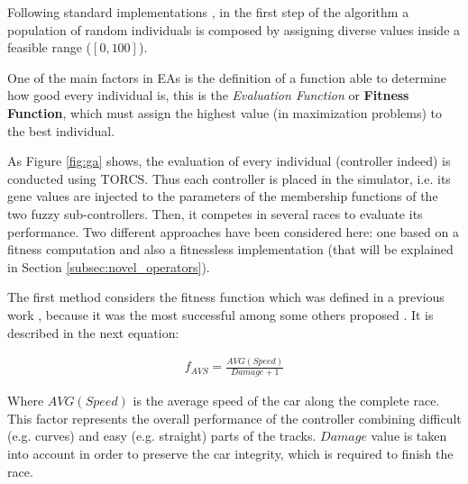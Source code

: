 \documentclass[10pt,journal,compsoc]{IEEEtran}
\begin{document}

Following standard implementations \cite{GAs_Goldberg89}, in the first step of the algorithm \cite{salem_evo17} a population of random individuals is composed by assigning diverse values inside a feasible range ($[0,100]$).

One of the main factors in EAs is the definition of a function able to determine how good every individual is, this is the \textit{Evaluation Function} or \textbf{Fitness Function}, which must assign the highest value (in maximization problems) to the best individual.

As Figure \ref{fig:ga} shows, the evaluation of every individual (controller indeed) is conducted using TORCS. Thus each controller is placed in the simulator, i.e. its gene values are injected to the parameters of the membership functions of the two fuzzy sub-controllers. Then, it competes in several races to evaluate its performance.
Two different approaches have been considered here: one based on a fitness computation and also a fitnessless implementation (that will be explained in Section \ref{subsec:novel_operators}).

The first method considers the fitness function which was defined in a previous work \cite{salem_cig2018}, because it was the most successful among some others proposed \cite{salem_evo18}. It is described in the next equation:

 \begin{equation} \label{fit_avg}
 	\begin{array}{lll}
 		f_{AVS}= \frac{AVG(Speed)}{Damage+1}
 	\end{array}
 \end{equation}	

Where $AVG(Speed)$ is the average speed of the car along the complete race. This factor represents the overall performance of the controller combining difficult (e.g. curves) and easy (e.g. straight) parts of the tracks. $Damage$ value is taken into account in order to preserve the car integrity, which is required to finish the race.
\end{document}
